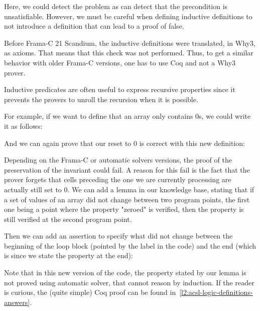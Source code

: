 Here, we could detect the problem as  can detect
that the precondition is unsatisfiable. However, we must be careful when defining
inductive definitions to not introduce a definition that can lead to a proof
of false.


\begin{Warning}
  Before Frama-C 21 Scandium, the inductive definitions were translated, in
  Why3, as axioms. That means that this check was not performed. Thus, to
  get a similar behavior with older Frama-C versions, one has to use Coq
  and not a Why3 prover.
\end{Warning}



Inductive predicates are often useful to express recursive properties since it
prevents the provers to unroll the recursion when it is possible.

For example, if we want to define that an array only contains 0s, we could
write it as follows:




And we can again prove that our reset to 0 is correct with this new
definition:


Depending on the Frama-C or automatic solvers versions, the proof of the
preservation of the invariant could fail. A reason for this fail is the fact that
the prover forgets that cells preceding the one we are currently processing
are actually still set to 0. We can add a lemma in our knowledge base, stating
that if a set of values of an array did not change between two program points,
the first one being a point where the property "zeroed" is verified, then the
property is still verified at the second program point.




Then we can add an assertion to specify what did not change between the
beginning of the loop block (pointed by the label  in the code)
and the end (which is  since we state the property at the end):




Note that in this new version of the code, the property stated by our lemma is
not proved using automatic solver, that cannot reason by induction. If the
reader is curious, the (quite simple) Coq proof can be found
in~\ref{l2:acsl-logic-definitions-answers}.


